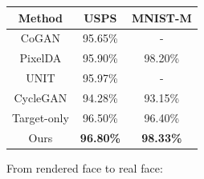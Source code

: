 \documentclass[landscape,a0paper,fontscale=0.285]{baposter} %
\begin{document}
\begin{poster}
{\begin{minipage}[t]{.65\linewidth}
\scriptsize
\setlength\tabcolsep{1pt}
  \begin{tabular}{ccc} \hline
  Method & USPS & MNIST-M \\ \hline
  CoGAN & 95.65\% & - \\
  PixelDA & 95.90\% & 98.20\% \\
  UNIT & 95.97\% & - \\
  CycleGAN & 94.28\% & 93.15\% \\
  Target-only & 96.50\% & 96.40\% \\
  Ours &  \textbf{96.80\%} & \textbf{98.33\%} \\ \hline
  \end{tabular}

\end{minipage}
{%
  \label{fig:mnist1}
}
\normalsize
From rendered face to real face:\\\\
\begin{minipage}[t]{.45\linewidth}


\end{minipage}}
\end{poster}
\end{document}
